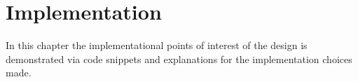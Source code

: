 \chapter{Implementation}

In this chapter the implementational points of interest of the design is demonstrated via code snippets and explanations for the implementation choices made.
\clearpage









